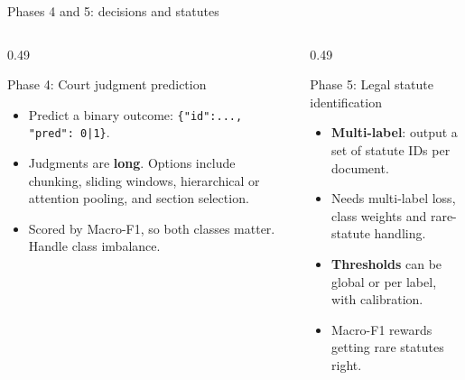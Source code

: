 \documentclass[aspectratio=169,11pt]{beamer}
\newcommand{\code}[1]{\texttt{\small #1}}
\begin{document}
\begin{frame}{Phases 4 and 5: decisions and statutes}
  \begin{columns}[T]
    \begin{column}{0.49\textwidth}
      \begin{block}{Phase 4: Court judgment prediction}
        \small
        \begin{itemize}
          \item Predict a binary outcome: \code{\{"id":..., "pred": 0|1\}}.
          \item Judgments are \textbf{long}. Options include chunking, sliding windows, hierarchical or attention pooling, and section selection.
          \item Scored by Macro-F1, so both classes matter. Handle class imbalance.
        \end{itemize}
      \end{block}
    \end{column}
    \begin{column}{0.49\textwidth}
      \begin{block}{Phase 5: Legal statute identification}
        \small
        \begin{itemize}
          \item \textbf{Multi-label}: output a set of statute IDs per document.
          \item Needs multi-label loss, class weights and rare-statute handling.
          \item \textbf{Thresholds} can be global or per label, with calibration.
          \item Macro-F1 rewards getting rare statutes right.
        \end{itemize}
      \end{block}
    \end{column}
  \end{columns}
\end{frame}
\end{document}
